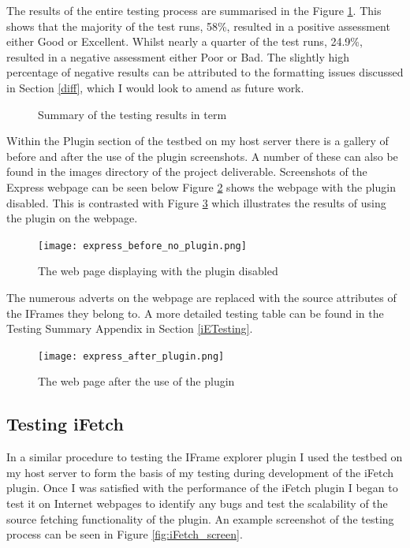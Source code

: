 \documentclass[12pt]{article}
\begin{document}
The results of the entire testing process are summarised in the Figure \ref{fig:iePie}. This shows that the majority of the test runs, 58\%, resulted in a positive assessment either Good or Excellent. Whilst nearly a quarter of the test runs, 24.9\%, resulted in a negative assessment either Poor or Bad. The slightly high percentage of negative results can be attributed to the formatting issues discussed in Section \ref{diff}, which I would look to amend as future work. 

\begin{figure} [H]
    \centering
        \caption{Summary of the testing results in term}
        \label{fig:iePie}
\end{figure}


Within the Plugin section of the testbed on my host server there is a gallery of before and after the use of the plugin screenshots. A number of these can also be found in the images directory of the project deliverable. Screenshots of the Express webpage can be seen below Figure \ref{fig:express_before_no_plugin} shows the webpage with the plugin disabled. This is contrasted with Figure \ref{fig:express_after_plugin} which illustrates the results of using the plugin on the webpage. 

\begin{figure}[H]
    \centering
    \texttt{[image: express\_before\_no\_plugin.png]}
    \caption{The web page displaying with the plugin disabled}
    \label{fig:express_before_no_plugin}
\end{figure}

The numerous adverts on the webpage are replaced with the source attributes of the IFrames they belong to. A more detailed testing table can be found in the Testing Summary Appendix in Section \ref{iETesting}.  

\begin{figure}[H]
    \centering
    \texttt{[image: express\_after\_plugin.png]}
    \caption{The web page after the use of the plugin}
    \label{fig:express_after_plugin}
\end{figure}

\subsection{Testing iFetch}
In a similar procedure to testing the IFrame explorer plugin I used the testbed on my host server to form the basis of my testing during development of the iFetch plugin. Once I was satisfied with the performance of the iFetch plugin I began to test it on Internet webpages to identify any bugs and test the scalability of the source fetching functionality of the plugin. An example screenshot of the testing process can be seen in Figure \ref{fig:iFetch_screen}.  
\end{document}
